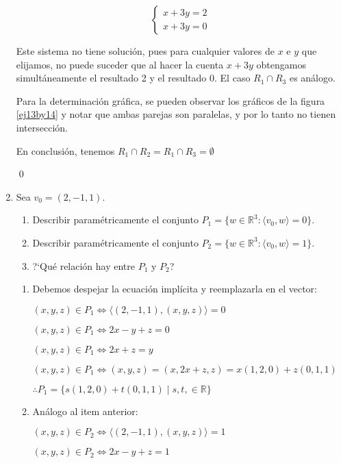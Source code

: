 \begin{enumerate}[resume,topsep=6pt, itemsep=.4cm]
\begin{equation*}
\left\{\begin{array}{l}
x+3y=2 \\
x+3y=0
\end{array} \right.
\end{equation*}

Este sistema no tiene solución, pues para cualquier valores de $x$ e $y$ que elijamos, no puede suceder que al hacer la cuenta $x+3y$ obtengamos simultáneamente el resultado 2 y el resultado 0. El caso $R_1\cap R_3$ es análogo.  

Para la determinación gráfica, se pueden observar los gráficos de la figura \ref{ej13by14} y notar que ambas parejas son paralelas, y por lo tanto no tienen intersección.

En conclusión, tenemos $\boxed{ R_1 \cap R_2 = R_1 \cap R_3 = \emptyset }$

\qed

\item Sea $v_0=(2,-1,1)$.
\begin{enumerate}
	\item Describir param{é}tricamente el conjunto
	$P_1=\{w\in\mathbb{ R}^3:\langle v_0 , w  \rangle=0\}$.
	\item Describir param{é}tricamente el conjunto
	$P_2=\{w\in\mathbb{ R}^3:\langle v_0 , w  \rangle=1\}$.
	\item ?`Qué relación hay entre $P_1$ y $P_2$?
\end{enumerate}


\rta

\begin{enumerate}
	\item Debemos despejar la ecuación implícita y reemplazarla en el vector:

$ (x,y,z) \in P_1 \iff \langle (2,-1,1) , (x,y,z) \rangle = 0$
	
$ (x,y,z) \in P_1 \iff 2x-y+z = 0$	

$ (x,y,z) \in P_1 \iff 2x+z = y$	

$ (x,y,z) \in P_1 \iff (x,y,z) = (x,2x+z,z) = x (1,2,0) + z (0,1,1)$	

$ \therefore \boxed{ P_1 = \{ s (1,2,0) + t (0,1,1) \; | \; s,t, \in \mathbb{R} \} }$
	
	\item Análogo al item anterior:

$ (x,y,z) \in P_2 \iff \langle (2,-1,1) , (x,y,z) \rangle = 1$
	
$ (x,y,z) \in P_2 \iff 2x-y+z = 1$	


\end{enumerate}
\end{enumerate}
